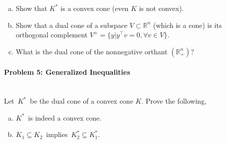 \documentclass[a4paper]{article}
\newenvironment{solution}
{\color{blue} \paragraph{Solution.}}
{\newline \qed}
\begin{document}
\begin{enumerate}[a)]
	\item Show that $K^*$ is a convex cone (even $K$ is not convex).
	
	\item Show that a dual cone of a subspace $V \subset \mathbb{R}^n$ (which is a cone) is its orthogonal complement $V^+ = \{ y| y^\top v = 0, \forall v \in V\}$.
	
	\item What is the dual cone of the nonnegative orthant $(\mathbb{R}_+^n)$?
\end{enumerate}





\paragraph{Problem 5: Generalized Inequalities}
~\\

\noindent
Let~$K^*$~be the dual cone of a convex cone $K$. Prove the following,
\begin{enumerate}[a)]
    \item $K^*$~is indeed a convex cone.

    \item $K_1 \subseteq K_2$~implies~$K^*_2 \subseteq K^*_1$.
\end{enumerate}



\end{document}
